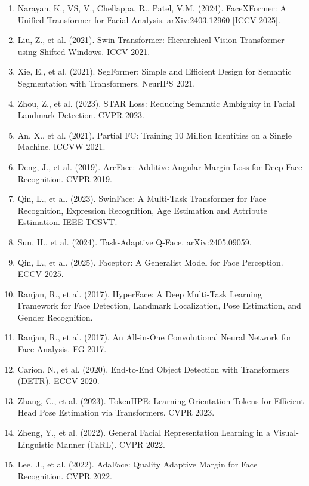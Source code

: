 \documentclass[11pt]{article}
\begin{document}
\begin{enumerate}[leftmargin=1.5em,itemsep=0.25em]

\item Narayan, K., VS, V., Chellappa, R., Patel, V.M. (2024). FaceXFormer: A Unified Transformer for Facial Analysis. arXiv:2403.12960 [ICCV 2025].

\item Liu, Z., et al. (2021). Swin Transformer: Hierarchical Vision Transformer using Shifted Windows. ICCV 2021.

\item Xie, E., et al. (2021). SegFormer: Simple and Efficient Design for Semantic Segmentation with Transformers. NeurIPS 2021.

\item Zhou, Z., et al. (2023). STAR Loss: Reducing Semantic Ambiguity in Facial Landmark Detection. CVPR 2023.

\item An, X., et al. (2021). Partial FC: Training 10 Million Identities on a Single Machine. ICCVW 2021.

\item Deng, J., et al. (2019). ArcFace: Additive Angular Margin Loss for Deep Face Recognition. CVPR 2019.

\item Qin, L., et al. (2023). SwinFace: A Multi-Task Transformer for Face Recognition, Expression Recognition, Age Estimation and Attribute Estimation. IEEE TCSVT.

\item Sun, H., et al. (2024). Task-Adaptive Q-Face. arXiv:2405.09059.

\item Qin, L., et al. (2025). Faceptor: A Generalist Model for Face Perception. ECCV 2025.

\item Ranjan, R., et al. (2017). HyperFace: A Deep Multi-Task Learning Framework for Face Detection, Landmark Localization, Pose Estimation, and Gender Recognition.

\item Ranjan, R., et al. (2017). An All-in-One Convolutional Neural Network for Face Analysis. FG 2017.

\item Carion, N., et al. (2020). End-to-End Object Detection with Transformers (DETR). ECCV 2020.

\item Zhang, C., et al. (2023). TokenHPE: Learning Orientation Tokens for Efficient Head Pose Estimation via Transformers. CVPR 2023.

\item Zheng, Y., et al. (2022). General Facial Representation Learning in a Visual-Linguistic Manner (FaRL). CVPR 2022.

\item Lee, J., et al. (2022). AdaFace: Quality Adaptive Margin for Face Recognition. CVPR 2022.

\end{enumerate}
\end{document}
